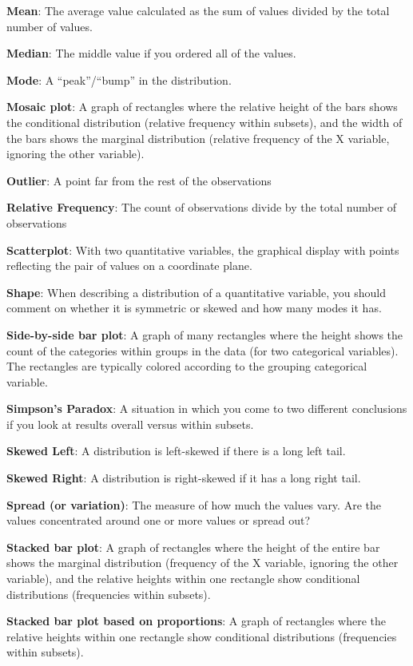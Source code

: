 \documentclass[
]{book}
\begin{document}
\textbf{Mean}: The average value calculated as the sum of values divided by the total number of values.

\textbf{Median}: The middle value if you ordered all of the values.

\textbf{Mode}: A ``peak''/``bump'' in the distribution.

\textbf{Mosaic plot}: A graph of rectangles where the relative height of the bars shows the conditional distribution (relative frequency within subsets), and the width of the bars shows the marginal distribution (relative frequency of the X variable, ignoring the other variable).

\textbf{Outlier}: A point far from the rest of the observations

\textbf{Relative Frequency}: The count of observations divide by the total number of observations

\textbf{Scatterplot}: With two quantitative variables, the graphical display with points reflecting the pair of values on a coordinate plane.

\textbf{Shape}: When describing a distribution of a quantitative variable, you should comment on whether it is symmetric or skewed and how many modes it has.

\textbf{Side-by-side bar plot}: A graph of many rectangles where the height shows the count of the categories within groups in the data (for two categorical variables). The rectangles are typically colored according to the grouping categorical variable.

\textbf{Simpson's Paradox}: A situation in which you come to two different conclusions if you look at results overall versus within subsets.

\textbf{Skewed Left}: A distribution is left-skewed if there is a long left tail.

\textbf{Skewed Right}: A distribution is right-skewed if it has a long right tail.

\textbf{Spread (or variation)}: The measure of how much the values vary. Are the values concentrated around one or more values or spread out?

\textbf{Stacked bar plot}: A graph of rectangles where the height of the entire bar shows the marginal distribution (frequency of the X variable, ignoring the other variable), and the relative heights within one rectangle show conditional distributions (frequencies within subsets).

\textbf{Stacked bar plot based on proportions}: A graph of rectangles where the relative heights within one rectangle show conditional distributions (frequencies within subsets).
\end{document}
